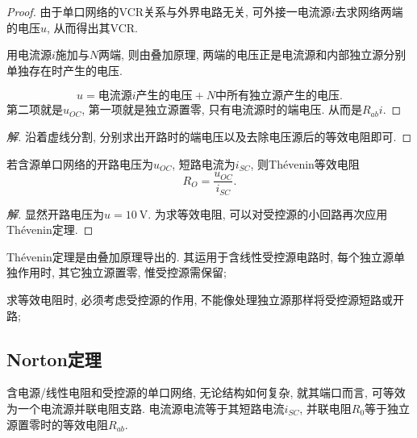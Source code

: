 \documentclass{ctexart}
\begin{document}
\begin{proof}
    由于单口网络的VCR关系与外界电路无关, 可外接一电流源$i$去求网络两端的电压$u$, 从而得出其VCR.
    \par
    用电流源$i$施加与$N$两端, 则由叠加原理, 两端的电压正是电流源和内部独立源分别单独存在时产生的电压.
    \par
    \[ u = \text{电流源$i$产生的电压} + \text{$N$中所有独立源产生的电压}. \]
    第二项就是$u_{OC}$, 第一项就是独立源置零, 只有电流源时的端电压. 从而是$R_{ab}i$.
\end{proof}
\begin{sample}
    \begin{ex}
    \end{ex}
    \begin{proof}[解]
        沿着虚线分割, 分别求出开路时的端电压以及去除电压源后的等效电阻即可.
    \end{proof}
\end{sample}
\begin{sample}
    \begin{ex}
        若含源单口网络的开路电压为$u_{OC}$, 短路电流为$i_{SC}$, 则Th\'evenin等效电阻
        \[ R_O = \frac{u_{OC}}{i_{SC}}. \]
    \end{ex}
\end{sample}
\begin{sample}
    \begin{ex}
    \end{ex}
    \begin{proof}[解]
        显然开路电压为$u=\SI{10}{\volt}$. 为求等效电阻, 可以对受控源的小回路再次应用Th\'evenin定理.
    \end{proof}
\end{sample}
\begin{cenum}
    \item Th\'evenin定理是由叠加原理导出的. 其运用于含线性受控源电路时, 每个独立源单独作用时, 其它独立源置零, 惟受控源需保留;
    \item 求等效电阻时, 必须考虑受控源的作用, 不能像处理独立源那样将受控源短路或开路;
\end{cenum}


\subsection{Norton定理} %
\label{sub:norton定理}

含电源/线性电阻和受控源的单口网络, 无论结构如何复杂, 就其端口而言, 可等效为一个电流源并联电阻支路. 电流源电流等于其短路电流$i_{SC}$, 并联电阻$R_0$等于独立源置零时的等效电阻$R_{ab}$.
\end{document}
